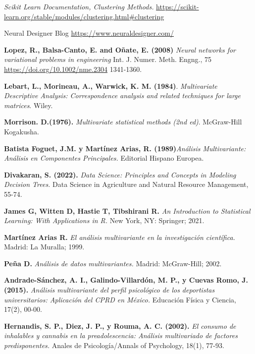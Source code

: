 \begin{thebibliography}{99}
 \textit{Scikit Learn Documentation, Clustering Methods. } \url{https://scikit-learn.org/stable/modules/clustering.html#clustering}


 Neural Designer Blog \url{https://www.neuraldesigner.com/}
          
 \textbf{Lopez, R., Balsa-Canto, E. and Oñate, E. (2008)} \textit{ Neural networks for variational problems in engineering} Int. J. Numer. Meth. Engng., 75\\ \url{https://doi.org/10.1002/nme.2304} 1341-1360. 


\textbf{Lebart, L., Morineau, A.,  Warwick, K. M. (1984)}.\textit{ Multivariate Descriptive Analysis: Correspondence analysis and related techniques for large matrices}. Wiley.

\textbf{Morrison. D.(1976).}\textit{ Multivariate statistical methods (2nd ed)}. McGraw-Hill Kogakusha.

\textbf{Batista Foguet, J.M. y Martínez Arias, R. (1989)}\textit{Análisis Multivariante: Análisis en Componentes Principales. } Editorial Hispano Europea.

\textbf{Divakaran, S. (2022). }\textit{Data Science: Principles and Concepts in Modeling Decision Trees.} Data Science in Agriculture and Natural Resource Management, 55-74.

\textbf{James G, Witten D, Hastie T, Tibshirani R.} \emph{An Introduction to Statistical Learning: With Applications in R.} New York, NY: Springer; 2021. 
  


\textbf{Martínez Arias R.} \emph{El análisis multivariante en la investigación científica.} Madrid: La Muralla; 1999. 
  


\textbf{Peña D.} \emph{Análisis de datos multivariantes.} Madrid: McGraw-Hill; 2002.

\textbf{Andrade-Sánchez, A. I., Galindo-Villardón, M. P., y Cuevas Romo, J. (2015).} \textit{Análisis multivariante del perfil psicológico de los deportistas universitarios: Aplicación del CPRD en México.} Educación Física y Ciencia, 17(2), 00-00.

\textbf{Hernandis, S. P., Diez, J. P., y Rouma, A. C. (2002).} \textit{El consumo de inhalables y cannabis en la preadolescencia: Análisis multivariado de factores predisponentes.} Anales de Psicología/Annals of Psychology, 18(1), 77-93.


\end{thebibliography}
